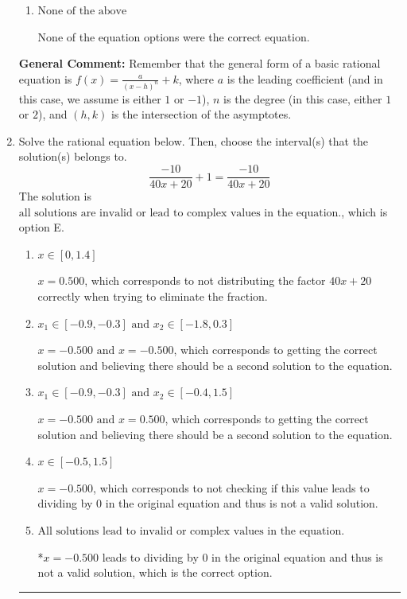 \documentclass{extbook}[14pt]
\newcommand{\litem}[1]{\item #1

\rule{\textwidth}{0.4pt}}
\begin{document}
\begin{enumerate}
{\begin{enumerate}[label=\Alph*.]
Corresponds to thinking the graph was a shifted version of $\frac{1}{x^2}$, using the general form $f(x) = \frac{a}{x-h}+k$, the opposite leading coefficient, AND not noticing the $y$-value was wrong.
\item \( \text{None of the above} \)

None of the equation options were the correct equation.
\end{enumerate}

\textbf{General Comment:} Remember that the general form of a basic rational equation is $ f(x) = \frac{a}{(x-h)^n} + k$, where $a$ is the leading coefficient (and in this case, we assume is either $1$ or $-1$), $n$ is the degree (in this case, either $1$ or $2$), and $(h, k)$ is the intersection of the asymptotes.
}
\litem{
Solve the rational equation below. Then, choose the interval(s) that the solution(s) belongs to.
\[ \frac{-10}{40x + 20} + 1 = \frac{-10}{40x + 20} \]The solution is \( \text{all solutions are invalid or lead to complex values in the equation.} \), which is option E.\begin{enumerate}[label=\Alph*.]
\item \( x \in [0,1.4] \)

$x = 0.500$, which corresponds to not distributing the factor $40x + 20$ correctly when trying to eliminate the fraction.
\item \( x_1 \in [-0.9, -0.3] \text{ and } x_2 \in [-1.8,0.3] \)

$x = -0.500 \text{ and } x = -0.500$, which corresponds to getting the correct solution and believing there should be a second solution to the equation.
\item \( x_1 \in [-0.9, -0.3] \text{ and } x_2 \in [-0.4,1.5] \)

$x = -0.500 \text{ and } x = 0.500$, which corresponds to getting the correct solution and believing there should be a second solution to the equation.
\item \( x \in [-0.5,1.5] \)

$x = -0.500$, which corresponds to not checking if this value leads to dividing by 0 in the original equation and thus is not a valid solution.
\item \( \text{All solutions lead to invalid or complex values in the equation.} \)

*$x = -0.500$ leads to dividing by 0 in the original equation and thus is not a valid solution, which is the correct option.
\end{enumerate}

}
\end{enumerate}
\end{document}
